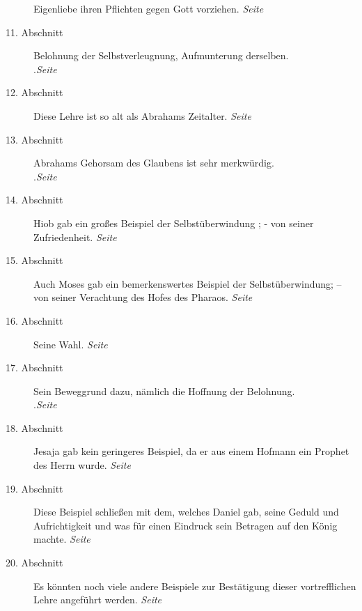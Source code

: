 \begin{description}
Eigenliebe ihren Pflichten gegen Gott vorziehen.
\dotfill \textit{Seite~\pageref{kap4_ab10}}\\
\item[11. Abschnitt] Belohnung der Selbstverleugnung, Aufmunterung derselben.\\
.\dotfill \textit{Seite~\pageref{kap4_ab11}}\\
\item[12. Abschnitt] Diese Lehre ist so alt als Abrahams Zeitalter.
\dotfill \textit{Seite~\pageref{kap4_ab12}}\\
\item[13. Abschnitt] Abrahams Gehorsam des Glaubens ist sehr merkwürdig.\\
.\dotfill \textit{Seite~\pageref{kap4_ab13}}\\
\item[14. Abschnitt] Hiob gab ein großes Beispiel der Selbstüberwindung
; - von
seiner Zufriedenheit.
\dotfill \textit{Seite~\pageref{kap4_ab14}}\\
\item[15. Abschnitt] Auch Moses gab ein
bemerkenswertes
Beispiel der
Selbstüberwindung; -- von seiner Verachtung des Hofes des Pharaos.
\dotfill \textit{Seite~\pageref{kap4_ab15}}\\
\item[16. Abschnitt] Seine Wahl.
\dotfill \textit{Seite~\pageref{kap4_ab16}}\\
\item[17. Abschnitt] Sein Beweggrund dazu, nämlich die Hoffnung der Belohnung.\\
.\dotfill \textit{Seite~\pageref{kap4_ab17}}\\
\item[18. Abschnitt] Jesaja gab kein geringeres Beispiel, da er aus einem
Hofmann ein Prophet des Herrn wurde.
\dotfill \textit{Seite~\pageref{kap4_ab18}}\\
\item[19. Abschnitt] Diese Beispiel schließen mit dem, welches Daniel gab,
seine Geduld und Aufrichtigkeit und was für einen Eindruck sein Betragen auf
den König machte.
\dotfill \textit{Seite~\pageref{kap4_ab19}}\\
\item[20. Abschnitt] Es könnten noch viele andere Beispiele zur Bestätigung
dieser vortrefflichen Lehre angeführt werden.
\dotfill \textit{Seite~\pageref{kap4_ab20}}\\

\end{description}
